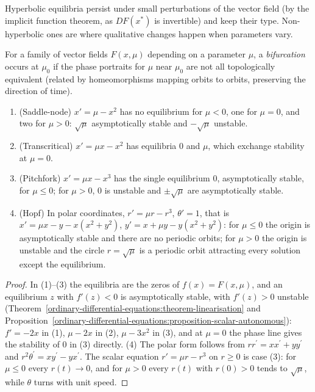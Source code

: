 Hyperbolic equilibria persist under small perturbations of the vector field (by the implicit function theorem, as $DF(x^*)$ is invertible) and keep their type. Non-hyperbolic ones are where qualitative changes happen when parameters
vary.

\begin{definition}\label{ordinary-differential-equations:definition-bifurcation}
For a family of vector fields $F(x, \mu)$ depending on a parameter $\mu$, a \emph{bifurcation} occurs at $\mu_0$ if the phase portraits for $\mu$ near $\mu_0$ are not all topologically equivalent (related by homeomorphisms mapping orbits
to orbits, preserving the direction of time).
\end{definition}

\begin{proposition}\label{ordinary-differential-equations:proposition-bifurcations}
\begin{enumerate}
\item (Saddle-node) $x' = \mu - x^2$ has no equilibrium for $\mu < 0$, one for $\mu = 0$, and two for $\mu > 0$: $\sqrt\mu$ asymptotically stable and $-\sqrt\mu$ unstable.
\item (Transcritical) $x' = \mu x - x^2$ has equilibria $0$ and $\mu$, which exchange stability at $\mu = 0$.
\item (Pitchfork) $x' = \mu x - x^3$ has the single equilibrium $0$, asymptotically stable, for $\mu \leq 0$; for $\mu > 0$, $0$ is unstable and $\pm\sqrt\mu$ are asymptotically stable.
\item (Hopf) In polar coordinates, $r' = \mu r - r^3$, $\theta' = 1$, that is $x' = \mu x - y - x(x^2 + y^2)$, $y' = x + \mu y - y(x^2 + y^2)$: for $\mu \leq 0$ the origin is asymptotically stable and there are no periodic orbits; for
$\mu > 0$ the origin is unstable and the circle $r = \sqrt\mu$ is a periodic orbit attracting every solution except the equilibrium.
\end{enumerate}
\end{proposition}

\begin{proof}
In (1)--(3) the equilibria are the zeros of $f(x) = F(x, \mu)$, and an equilibrium $z$ with $f'(z) < 0$ is asymptotically stable, with $f'(z) > 0$ unstable (Theorem~\ref{ordinary-differential-equations:theorem-linearisation} and
Proposition~\ref{ordinary-differential-equations:proposition-scalar-autonomous}): $f' = -2x$ in (1), $\mu - 2x$ in (2), $\mu - 3x^2$ in (3), and at $\mu = 0$ the phase line gives the stability of $0$ in (3) directly. (4) The polar form follows from
$rr^{\prime} = xx^{\prime} + yy^{\prime}$ and $r^2\theta^{\prime} = xy^{\prime} - yx^{\prime}$. The scalar equation $r' = \mu r - r^3$ on $r \geq 0$ is case (3): for $\mu \leq 0$ every $r(t) \to 0$, and for $\mu > 0$ every $r(t)$ with $r(0) > 0$ tends to
$\sqrt\mu$, while $\theta$ turns with unit speed.
\end{proof}

